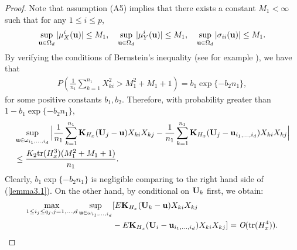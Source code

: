 \documentclass[11pt]{article}
\theoremstyle{definition}
\begin{document}
\begin{proof}
 	
 	Note that assumption (A5) implies that there exists a constant $M_1<\infty$ such that for any $1\leq i\leq p$,
 	$$\sup_{{\bf u}\in \Omega_d}|\mu_{X}^i({\bf u})|\leq M_1,~~~\sup_{{\bf u}\in \Omega_d}|\mu_{Y}^i({\bf u})|\leq M_1,~~~\sup_{{\bf u}\in \Omega_d}|\sigma_{ii}({\bf u})|\leq M_1.$$
 	By verifying the conditions of Bernstein's inequality (see for example \cite{LinBai}), we have that
 	\begin{eqnarray*}
 		P\left(\frac{1}{n_1}\sum_{k=1}^{n_1}X_{ki}^2 >M_1^2+M_1+1\right)=b_1\exp\{-b_2n_1\},
 	\end{eqnarray*}
 	for some positive constants $b_1, b_2$. Therefore, with probability greater than $1-b_1\exp\{-b_2n_1\}$,
 	\begin{align}\label{lemma3.5}
 		&\sup_{{\bf u}\in\omega_{i_1,\ldots,i_d}}\Big|\frac{1}{n_1}\sum_{k=1}^{n_1}{\bf K}_{H_x}({\bf U}_j-{\bf u})X_{ki}X_{kj}-\frac{1}{n_1}\sum_{k=1}^{n_1}{\bf K}_{H_x}({\bf U}_j-{\bf u}_{i_1,\ldots,i_d})X_{ki}X_{kj} \Big|    \\&\leq \frac{ K_2{\rm tr}(H^3_x)(M_1^2+M_1+1)}{n_1}.\nonumber
 	\end{align}
 	Clearly, $b_1\exp\{-b_2n_1\}$ is negligible comparing to the right hand side of (\ref{lemma3.1}).
 	On the other hand, by conditional on ${\bf U}_k$ first, we obtain:
 	\begin{align}\label{lemma3.6}
 		\max_{1\leq i_j \leq q_j, j=1,\ldots,d}\sup_{{\bf u}\in\omega_{i_1,\ldots,i_d}}&[E{\bf K}_{H_x}({\bf U}_k-{\bf u})X_{ki}X_{kj} \\&-E{\bf K}_{H_x}({\bf U}_i-{\bf u}_{i_1,\ldots,i_d})X_{ki}X_{kj}]   =\emph{O}({\rm tr}(H_x^4)).\nonumber
 	\end{align}
 	

\end{proof}
\end{document}
